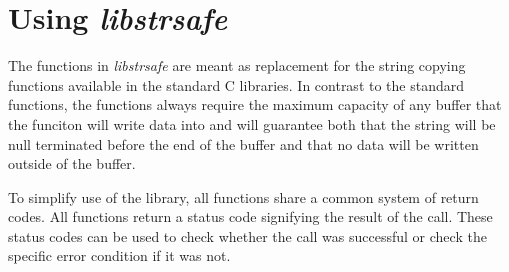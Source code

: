 \section{Using \emph{libstrsafe}}
The functions in \emph{libstrsafe} are meant as replacement for
the string copying functions available in the standard C libraries.
In contrast to the standard functions,
the functions always require the maximum capacity of any buffer
that the funciton will write data into
and will guarantee both
that the string will be null terminated before the end of the buffer
and that no data will be written outside of the buffer.

To simplify use of the library,
all functions share a common system of return codes.
All functions return a status code signifying the result of the call.
These status codes can be used to check whether the call was successful
or check the specific error condition if it was not.
